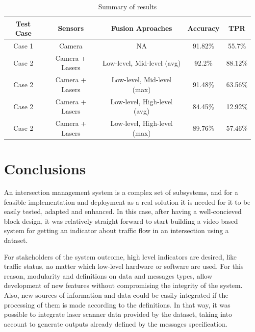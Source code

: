 

 

\begin{table}[ht!]
\footnotesize
\begin{tabular}{|c| c| c| c| c|}

\hline
\textbf{Test Case} & \textbf{Sensors} & \textbf{Fusion Aproaches} & \textbf{Accuracy} & \textbf{TPR} \\
\hline
Case 1 & Camera & NA & 91.82\% & 55.7\% \\
\hline
Case 2 & Camera + Lasers & Low-level, Mid-level (avg) & 92.2\% & 88.12\%\\
\hline
Case 2 & Camera + Lasers & Low-level, Mid-level (max) & 91.48\% & 63.56\% \\
\hline
Case 2 & Camera + Lasers & Low-level, High-level (avg) & 84.45\% & 12.92\% \\
\hline
Case 2 & Camera + Lasers & Low-level, High-level (max) & 89.76\% & 57.46\%\\
\hline
\end{tabular}
\caption{Summary of results}
\label{results}
\end{table}



\section{Conclusions}

An intersection management system is a complex set of subsystems, and for a feasible implementation and deployment as a real solution it is needed for it to be easily tested, adapted and enhanced. In this case, after having a well-concieved block design, it was relatively straight forward to start building a video based system for getting an indicator about traffic flow in an intersection using a dataset.

For stakeholders of the system outcome, high level indicators are desired, like traffic status, no matter which low-level hardware or software are used. For this reason, modularity and definitions on data and messages types, allow development of new features without compromising the integrity of the system. Also, new sources of information and data could be easily integrated if the processing of them is made according to the definitions. In that way, it was possible to integrate laser scanner data provided by the dataset, taking into account to generate outputs already defined by the messages specification.

